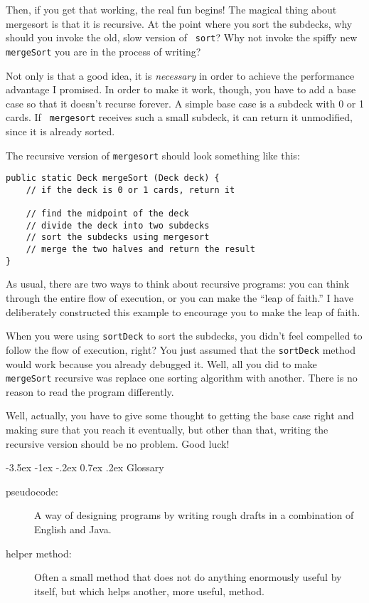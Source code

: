 \documentclass{book}
\makeatletter
\renewcommand{\section}{\@startsection 
    {section} {1} {0mm}%
    {-3.5ex \@plus -1ex \@minus -.2ex}%
    {0.7ex \@plus.2ex}%
    {\normalfont\Large\bfseries}}
\makeatother
\begin{document}
Then, if you get that working, the real fun begins!  The magical thing
about mergesort is that it is recursive.  At the point where you sort
the subdecks, why should you invoke the old, slow version of {\tt
sort}?  Why not invoke the spiffy new {\tt mergeSort} you are in the
process of writing?


Not only is that a good idea, it is {\em necessary} in order to
achieve the performance advantage I promised.  In order to make it
work, though, you have to add a base case so that it doesn't recurse
forever.  A simple base case is a subdeck with 0 or 1 cards.  If {\tt
mergesort} receives such a small subdeck, it can return it
unmodified, since it is already sorted.

The recursive version of {\tt mergesort} should look something
like this:

\begin{verbatim}
public static Deck mergeSort (Deck deck) {
    // if the deck is 0 or 1 cards, return it

    // find the midpoint of the deck
    // divide the deck into two subdecks
    // sort the subdecks using mergesort
    // merge the two halves and return the result
}
\end{verbatim}
%
As usual, there are two ways to think about recursive programs:
you can think through the entire flow of execution, or you
can make the ``leap of faith.''  I have deliberately constructed
this example to encourage you to make the leap of faith.


When you were using {\tt sortDeck} to sort the subdecks, you didn't
feel compelled to follow the flow of execution, right?  You just
assumed that the {\tt sortDeck} method would work because you already
debugged it.  Well, all you did to make {\tt mergeSort} recursive was
replace one sorting algorithm with another.  There is no reason to read
the program differently.

Well, actually, you have to give some thought to getting the
base case right and making sure that you reach it eventually,
but other than that, writing the recursive version should be
no problem.  Good luck!


\section{Glossary}

\begin{description}

\item[pseudocode:]  A way of designing programs by writing
rough drafts in a combination of English and Java.

\item[helper method:]  Often a small method that does not
do anything enormously useful by itself, but which helps
another, more useful, method.



\end{description}
\end{document}
